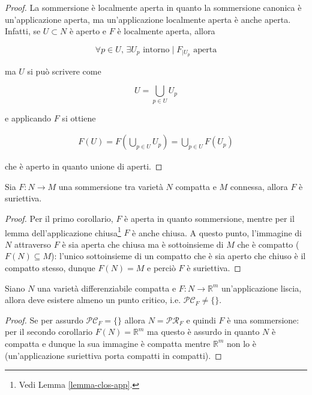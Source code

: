\begin{proof}
	La sommersione è localmente aperta in quanto la sommersione canonica è un'applicazione aperta, ma un'applicazione localmente aperta è anche aperta. Infatti, se $ U \subset N $ è aperto e $ F $ è localmente aperta, allora
	
	\begin{equation}
		\forall p \in U, \, \exists U_{p} \text{ intorno} \mid F_{|U_{p}} \text{ aperta}
	\end{equation}

	ma $ U $ si può scrivere come
	
	\begin{equation}
		U = \bigcup_{p \in U} U_{p}
	\end{equation}

	e applicando $ F $ si ottiene
	
	\begin{align}
		F(U) = F \left( \bigcup_{p \in U} U_{p} \right) = \bigcup_{p \in U} F(U_{p})
	\end{align}

	che è aperto in quanto unione di aperti.
\end{proof}

\begin{corollary}[2]
	Sia $ F : N \to M $ una sommersione tra varietà $ N $ compatta e $ M $ connessa, allora $ F $ è suriettiva.
\end{corollary}

\begin{proof}
	Per il primo corollario, $ F $ è aperta in quanto sommersione, mentre per il lemma dell'applicazione chiusa\footnote{%
		Vedi Lemma \ref{lemma-clos-app}.%
	} $ F $ è anche chiusa. A questo punto, l'immagine di $ N $ attraverso $ F $ è sia aperta che chiusa ma è sottoinsieme di $ M $ che è compatto ($ F(N) \subseteq M $): l'unico sottoinsieme di un compatto che è sia aperto che chiuso è il compatto stesso, dunque $ F(N) = M $ e perciò $ F $ è suriettiva.
\end{proof}

\begin{corollary}[3]
	Siano $ N $ una varietà differenziabile compatta e $ F : N \to \mathbb{R}^{m} $ un'applicazione liscia, allora deve esistere almeno un punto critico, i.e. $ \mathcal{PC}_{F} \neq \{\} $.
\end{corollary}

\begin{proof}
	Se per assurdo $ \mathcal{PC}_{F} = \{\} $ allora $ N = \mathcal{PR}_{F} $ e quindi $ F $ è una sommersione: per il secondo corollario $ F(N) = \mathbb{R}^{m} $ ma questo è assurdo in quanto $ N $ è compatta e dunque la sua immagine è compatta mentre $ \mathbb{R}^{m} $ non lo è (un'applicazione suriettiva porta compatti in compatti).
\end{proof}

